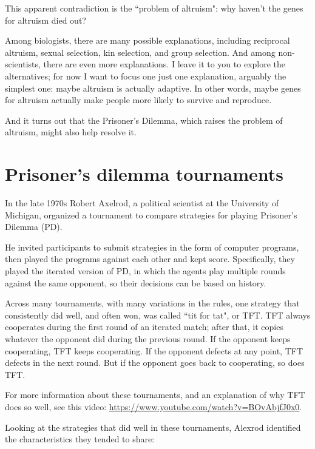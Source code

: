 \documentclass[12pt]{book}
\theoremstyle{exercise}
\begin{document}
This apparent contradiction is the ``problem of altruism": why haven't the genes for altruism died out?

Among biologists, there are many possible explanations, including reciprocal altruism, sexual selection, kin selection, and group selection.  And among non-scientists, there are even more explanations.  I leave it to you to explore the alternatives; for now I want to focus one just one explanation, arguably the simplest one: maybe altruism is actually adaptive.  In other words, maybe genes for altruism actually make people more likely to survive and reproduce.

And it turns out that the Prisoner's Dilemma, which raises the problem of altruism, might also help resolve it.


\section{Prisoner's dilemma tournaments}

In the late 1970s Robert Axelrod, a political scientist at the University of Michigan, organized a tournament to compare strategies for playing Prisoner's Dilemma (PD).

He invited participants to submit strategies in the form of computer programs, then played the programs against each other and kept score.  Specifically, they played the iterated version of PD, in which the agents play multiple rounds against the same opponent, so their decisions can be based on history.

Across many tournaments, with many variations in the rules, one strategy that consistently did well, and often won, was called ``tit for tat", or TFT.  TFT always cooperates during the first round of an iterated match; after that, it copies whatever the opponent did during the previous round.  If the opponent keeps cooperating, TFT keeps cooperating.  If the opponent defects at any point, TFT defects in the next round.  But if the opponent goes back to cooperating, so does TFT.

For more information about these tournaments, and an explanation of why TFT does so well, see this video: \url{https://www.youtube.com/watch?v=BOvAbjfJ0x0}.

Looking at the strategies that did well in these tournaments, Alexrod identified the characteristics they tended to share:
\end{document}
